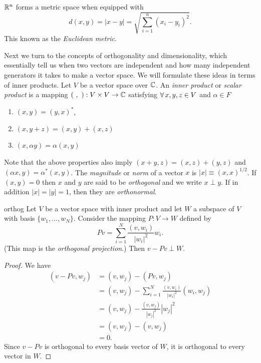 \begin{example*}{}{}
 $\mathbb{R}^n$ forms a metric space when equipped with
  \begin{equation}
    d(x,y)=|x-y|=\sqrt{\sum\limits_{i=1}^n(x_i-y_i)^2}.
  \end{equation}
  This known as the {\it Euclidean metric}.
\end{example*}


Next we turn to the concepts of orthogonality and dimensionality, which
essentially tell us when two vectors are independent and how many independent
generators it takes to make a vector space.
We will formulate these ideas in terms of inner products.
  Let $V$ be a vector space over $\mathbb{C}$. An {\it inner
  product} or {\it scalar product} is a mapping
  $(\ ,\ ):V\times V\to \C$
  satisfying $\operatorname{\forall} x,y,z\in V$ and $\alpha \in F$
  \begin{enumerate}
    \item $(x,y)=(y,x)^{*}$,
    \item $(x,y+z)=(x,y)+(x,z)$
    \item $(x,\alpha y)=\alpha(x,y)$
  \end{enumerate}
  Note that the above properties also imply $(x+y,z)=(x,z)+(y,z)$ and
  $(\alpha x,y)=\alpha^{*}(x,y)$. The {\it magnitude} or {\it norm}
  of a vector $x$ is $|x|\equiv(x,x)^{1/2}$. If $(x,y)=0$ then $x$
  and $y$ are said to be {\it orthogonal} and we write $x\perp y$.
  If in addition $|x|=|y|=1$, then they are {\it orthonormal}.

\begin{proposition}{}{orthog}
  Let $V$ be a vector space with inner product and let $W$ a subspace
  of $V$ with basis $\{w_1,...,w_N\}$. Consider the mapping $P:V\to W$
  defined by
  $$
    Pv=\sum_{i=1}^N\frac{(v,w_i)}{|w_i|^2}w_i.
  $$
  (This map is the {\it orthogonal
  projection}.)
  Then $v-Pv\perp W.$
  \begin{proof}
    We have
    \begin{equation*}
      \begin{aligned}
        (v-Pv,w_j)&=(v,w_j)-(Pv,w_j)\\
          &=(v,w_j)-\sum_{i=1}^N\frac{(v,w_i)}{|w_i|^2}(w_i,w_j)\\
          &=(v,w_j)-\frac{(v,w_j)}{|w_j|^2}|w_j|^2\\
          &=(v,w_j)-(v,w_j)\\
          &=0.
      \end{aligned}
    \end{equation*}
    Since $v-Pv$ is orthogonal to every basis vector of $W$, it is
    orthogonal to every vector in $W$.
  \end{proof}
\end{proposition}

